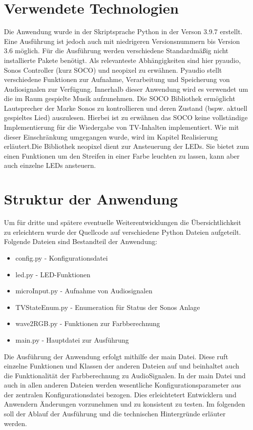 \section{Verwendete Technologien}
Die Anwendung wurde in der Skriptsprache Python in der Verson 3.9.7 erstellt. Eine Ausführung ist jedoch auch mit niedrigeren Versionsnummern bis Version 3.6 möglich.
Für die Ausführung werden verschiedene Standardmäßig nicht installierte Pakete benötigt. Als relevanteste Abhängigkeiten sind hier pyaudio, Sonos Controller (kurz SOCO) und neopixel zu erwähnen.
Pyaudio stellt verschiedene Funktionen zur Aufnahme, Verarbeitung und Speicherung von Audiosignalen zur Verfügung. Innerhalb dieser Anwendung wird es verwendet um 
die im Raum gespielte Musik aufzunehmen. Die SOCO Bibliothek ermöglicht Lautsprecher der Marke Sonos zu kontrollieren und deren Zustand (bspw. aktuell gespieltes Lied) 
auszulesen. Hierbei ist zu erwähnen das SOCO keine vollständige Implementierung für die Wiedergabe von TV-Inhalten implementiert. Wie mit dieser Einschränkung umgegangen wurde,
wird im Kapitel Realisierung erläutert.Die Bibliothek neopixel dient zur Ansteuerung der
LEDs. Sie bietet zum einen Funktionen um den Streifen in einer Farbe leuchten zu lassen, kann aber auch einzelne LEDs ansteuern.

\section{Struktur der Anwendung}
Um für dritte und spätere eventuelle Weiterentwicklungen die Übersichtlichkeit zu erleichtern wurde der Quellcode auf verschiedene Python Dateien aufgeteilt. 
Folgende Dateien sind Bestandteil der Anwendung:

\begin{itemize}
\item config.py - Konfigurationsdatei
\item led.py - LED-Funktionen
\item microInput.py - Aufnahme von Audiosignalen
\item TVStateEnum.py - Enumeration für Status der Sonos Anlage
\item wave2RGB.py - Funktionen zur Farbberechnung
\item main.py - Hauptdatei zur Ausführung
\end{itemize}

Die Ausführung der Anwendung erfolgt mithilfe der main Datei. Diese ruft einzelne Funktionen und Klassen der anderen Dateien auf und beinhaltet auch die Funktionalität der
Farbberechnung zu AudioSignalen. In der main Datei und auch in allen anderen Dateien werden wesentliche Konfigurationsparameter aus der zentralen Konfigurationsdatei bezogen.
Dies erleichtetert Entwicklern und Anwendern Änderungen vorzunehmen und zu konsistent zu testen. Im  folgenden soll der Ablauf der Ausführung und die technischen Hintergründe
erläuter werden.

